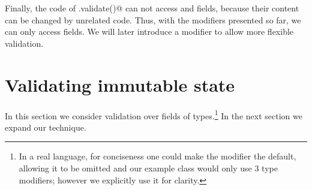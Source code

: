 Finally,
the code of \Q@.validate()@ can not access  \Q@mut@ and \Q@read@ fields, because their content can be changed by unrelated code.
Thus, with the modifiers presented so far, we can only access \Q@imm@ fields.
We will later introduce a \Q@capsule@ modifier to allow more flexible validation.



%

\section{Validating immutable state}
In this section we consider validation over fields of \Q@imm@ types.\footnote{
In a real language, for conciseness one could make the \Q@imm@ modifier the default, allowing it to be omitted and our \Q@Person@ example class would only use 3 type modifiers; however we explicitly use it for clarity.
}
In the next section we expand our technique.

